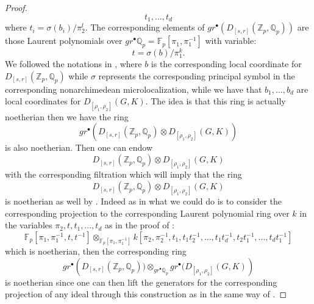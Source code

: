 \documentclass[12pt]{amsart}
\theoremstyle{definition}
\numberwithin{equation}{section}
\begin{document}
\begin{proof}
\begin{displaymath}
t_1,...,t_d	
\end{displaymath}
where $t_i=\sigma(b_i)/\pi_2^l$. The corresponding elements of $gr^\bullet \left(D_{[s,r]}(\mathbb{Z}_p,\mathbb{Q}_p) \right)$ are those Laurent polynomials over $gr^\bullet \mathbb{Q}_p=\mathbb{F}_p[\pi_1,\pi_1^{-1}]$ with variable:
\begin{displaymath}
t=\sigma(b)/\pi_1^{k}.
\end{displaymath}
We followed the notations in \cite[Proposition 4.1]{Zab1}, where $b$ is the corresponding local coordinate for $D_{[s,r]}(\mathbb{Z}_p,\mathbb{Q}_p)$ while $\sigma$ represents the corresponding principal symbol in the corresponding nonarchimedean microlocalization, while we have that $b_1,...,b_d$ are local coordinates for $D_{[\rho_1,\rho_2]}(G,K)$. The idea is that this ring is actually noetherian then we have the ring
\begin{displaymath}
gr^\bullet \left(D_{[s,r]}(\mathbb{Z}_p,\mathbb{Q}_p)\otimes D_{[\rho_1,\rho_2]}(G,K)\right)	
\end{displaymath}
is also noetherian. Then one can endow 
\begin{displaymath}
D_{[s,r]}(\mathbb{Z}_p,\mathbb{Q}_p)\widehat{\otimes} D_{[\rho_1,\rho_2]}(G,K)
\end{displaymath}
with the corresponding filtration which will imply that the ring 
\begin{displaymath}
D_{[s,r]}(\mathbb{Z}_p,\mathbb{Q}_p)\widehat{\otimes}  D_{[\rho_1,\rho_2]}(G,K)
\end{displaymath}
is noetherian as well by \cite[Proposition I.7.1.2]{LVO}. Indeed as in \cite[Proposition 4.1]{Zab1} what we could do is to consider the corresponding projection to the corresponding Laurent polynomial ring over $k$ in the variables $\pi_2,t,t_1,...,t_d$ as in the proof of \cite[Proposition 4.1]{Zab1}:
\begin{displaymath}
\mathbb{F}_p[\pi_1,\pi_1^{-1},t,t^{-1}]\otimes_{\mathbb{F}_p[\pi_1,\pi_1^{-1}]} k[\pi_2,\pi_2^{-1},t_1,t_1t_2^{-1},...,t_1t_d^{-1},t_2t_1^{-1},...,t_dt_1^{-1}]	
\end{displaymath}
which is noetherian, then the corresponding ring
\begin{displaymath}
gr^\bullet \left(D_{[s,r]}(\mathbb{Z}_p,\mathbb{Q}_p))\otimes_{gr^\bullet\mathbb{Q}_p} gr^\bullet( D_{[\rho_1,\rho_2]}(G,K)\right)	
\end{displaymath}
is noetherian since one can then lift the generators for the corresponding projection of any ideal through this construction as in the same way of \cite[Proposition 4.1]{Zab1}.
\end{proof}
\end{document}
